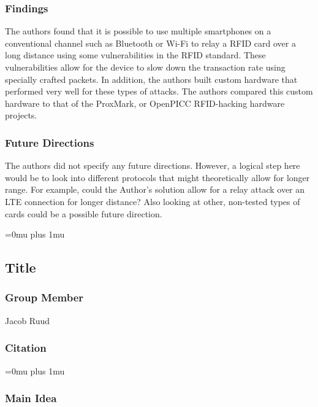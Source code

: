 \subsubsection{Findings}

\noindent
The authors found that it is possible to use multiple smartphones on a conventional channel such as Bluetooth or Wi-Fi to relay a RFID card over a long distance using some vulnerabilities in the RFID standard.  These vulnerabilities allow for the device to slow down the transaction rate using specially crafted packets. In addition, the authors built custom hardware that performed very well for these types of attacks.  The authors compared this custom hardware to that of the ProxMark, or OpenPICC RFID-hacking hardware projects.

\subsubsection{Future Directions}

\noindent
The authors did not specify any future directions.  However, a logical step here would be to look into different protocols that might theoretically allow for longer range.  For example, could the Author's solution allow for a relay attack over an LTE connection for longer distance?  Also looking at other, non-tested types of cards could be a possible future direction.

\Urlmuskip=0mu plus 1mu\relax

\noindent
\subsection{Title}

\subsubsection{Group Member}

\noindent
Jacob Ruud

\noindent
\subsubsection{Citation}

\Urlmuskip=0mu plus 1mu\relax

\subsubsection{Main Idea}

